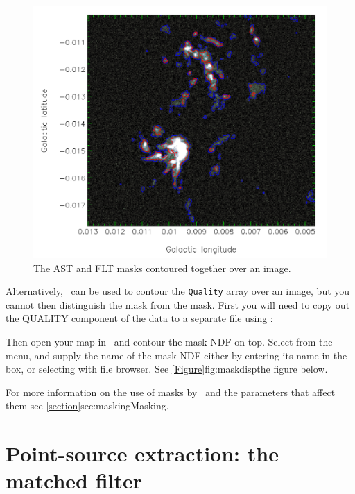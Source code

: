 \begin{figure}[t!]
\includegraphics[width=0.6\linewidth]{sc21_masks}
\caption[AST and FLT masks shown together]{The AST and FLT masks contoured
together over an image.}
\label{fig:masks}
\end{figure}

Alternatively, \gaia\ can be used to contour the \texttt{Quality} array
over an image, but you cannot then distinguish the  mask from
the  mask. First you will need to copy out the QUALITY component
of the data to a separate file using :

\begin{terminalv}
\end{terminalv}

Then open your map in \gaia\ and contour the mask NDF on top.
Select  from the 
menu, and supply the name of the mask NDF either by entering its name in
the  box, or selecting with
 file browser. See
\cref{Figure}{fig:maskdisp}{the figure below}.

For more information on the use of masks by \makemap\ and the
parameters that affect them see \cref{section}{sec:masking}{Masking}.



\section{Point-source extraction: the matched filter}
\label{sec:mf}

